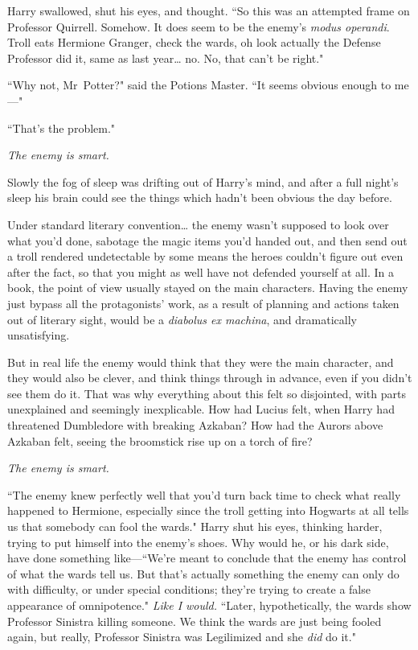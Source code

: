 Harry swallowed, shut his eyes, and thought. ``So this was an attempted frame on Professor Quirrell. Somehow. It does seem to be the enemy's \emph{modus operandi}. Troll eats Hermione Granger, check the wards, oh look actually the Defense Professor did it, same as last year{\ldots} no. No, that can't be right."

``Why not, Mr~Potter?" said the Potions Master. ``It seems obvious enough to me—"

``That's the problem."

\emph{The enemy is smart.}

Slowly the fog of sleep was drifting out of Harry's mind, and after a full night's sleep his brain could see the things which hadn't been obvious the day before.

Under standard literary convention{\ldots} the enemy wasn't supposed to look over what you'd done, sabotage the magic items you'd handed out, and then send out a troll rendered undetectable by some means the heroes couldn't figure out even after the fact, so that you might as well have not defended yourself at all. In a book, the point of view usually stayed on the main characters. Having the enemy just bypass all the protagonists' work, as a result of planning and actions taken out of literary sight, would be a \emph{diabolus ex machina}, and dramatically unsatisfying.

But in real life the enemy would think that they were the main character, and they would also be clever, and think things through in advance, even if you didn't see them do it. That was why everything about this felt so disjointed, with parts unexplained and seemingly inexplicable. How had Lucius felt, when Harry had threatened Dumbledore with breaking Azkaban? How had the Aurors above Azkaban felt, seeing the broomstick rise up on a torch of fire?

\emph{The enemy is smart.}

``The enemy knew perfectly well that you'd turn back time to check what really happened to Hermione, especially since the troll getting into Hogwarts at all tells us that somebody can fool the wards." Harry shut his eyes, thinking harder, trying to put himself into the enemy's shoes. Why would he, or his dark side, have done something like—``We're meant to conclude that the enemy has control of what the wards tell us. But that's actually something the enemy can only do with difficulty, or under special conditions; they're trying to create a false appearance of omnipotence." \emph{Like I would.} ``Later, hypothetically, the wards show Professor Sinistra killing someone. We think the wards are just being fooled again, but really, Professor Sinistra was Legilimized and she \emph{did} do it."

